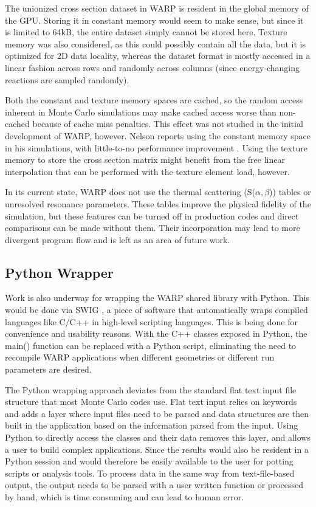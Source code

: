 The unionized cross section dataset in WARP is resident in the global memory of the GPU.  Storing it in constant memory would seem to make sense, but since it is limited to 64kB, the entire dataset simply cannot be stored here.  Texture memory was also considered, as this could possibly contain all the data, but it is optimized for 2D data locality, whereas the dataset format is mostly accessed in a linear fashion across rows and randomly across columns (since energy-changing reactions are sampled randomly).  

Both the constant and texture memory spaces are cached, so the random access inherent in Monte Carlo simulations may make cached access worse than non-cached because of cache miss penalties.  This effect was not studied in the initial development of WARP, however.  Nelson reports using the constant memory space in his simulations, with little-to-no performance improvement \cite{nelson}.  Using the texture memory to store the cross section matrix might benefit from the free linear interpolation that can be performed with the texture element load, however. %

In its current state, WARP does not use the thermal scattering (S($\alpha,$$\beta$)) tables or unresolved resonance parameters.   These tables improve the physical fidelity of the simulation, but these features can be turned off in production codes and direct comparisons can be made without them.  Their incorporation may lead to more divergent program flow and is left as an area of future work.

\subsection{Python Wrapper}

Work is also underway for wrapping the WARP shared library with Python.  This would be done via SWIG \cite{swig}, a piece of software that automatically wraps compiled languages like C/C++ in high-level scripting languages.  This is being done for convenience and usability reasons.  With the C++ classes exposed in Python, the main() function can be replaced with a Python script, eliminating the need to recompile WARP applications when different geometries or different run parameters are desired. %

The Python wrapping approach deviates from the standard flat text input file structure that most Monte Carlo codes use.  Flat text input relies on keywords and adds a layer where input files need to be parsed and data structures are then built in the application based on the information parsed from the input.  Using Python to directly access the classes and their data removes this layer, and allows a user to build complex applications.  Since the results would also be resident in a Python session and would therefore be easily available to the user for potting scripts or analysis tools.  To process data in the same way from text-file-based output, the output needs to be parsed with a user written function or processed by hand, which is time consuming and can lead to human error.

